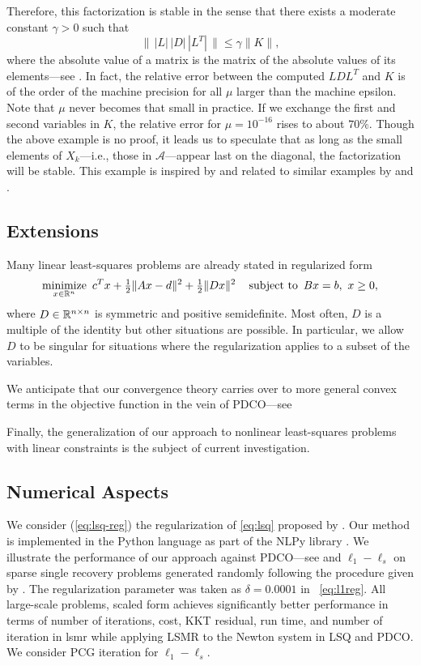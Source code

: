 \documentclass{amsart}
\begin{document}
Therefore, this factorization is stable in the sense that there exists a
moderate constant $\gamma > 0$ such that
\[
  \| \, |L| \, |D| \, |L^T| \, \| \leq \gamma \|K\|,
\]
where the absolute value of a matrix is the matrix of the absolute values of
its elements---see \cite{golub-vanloan-1996}. In fact, the relative error
between the computed $LDL^T$ and $K$ is of the order of the machine precision for
all $\mu$ larger than the machine epsilon. Note that $\mu$ never becomes that
small in practice. If we exchange the first and second variables in $K$, the
relative error for $\mu = 10^{-16}$ rises to about $70\%$. Though the above
example is no proof, it leads us to speculate that as long as the small
elements of $X_k$---i.e., those in $\mathcal{A}$---appear last on the diagonal,
the factorization will be stable. This example is inspired by and related to
similar examples by \cite{vanderbei-1995} and
\cite{gill-saunders-shinnerl-1996}.

\subsection{Extensions}

Many linear least-squares problems are already stated in regularized form
\begin{equation}
  \label{eq:reg-lsq}
  \displaystyle\mathop{\textup{minimize}}_{x \in \mathbb{R}^n} \ c^T x + \tfrac{1}{2} \|Ax - d\|^2 + \tfrac{1}{2} \|Dx\|^2 \quad
  \mathop{\textup{subject to}} \ Bx = b, \ x \geq 0,
\end{equation}
where $D \in \mathbb{R}^{n \times n}$ is symmetric and positive semidefinite. Most
often, $D$ is a multiple of the identity but other situations are possible. In
particular, we allow $D$ to be singular for situations where the regularization
applies to a subset of the variables.

We anticipate that our convergence theory carries over to more general convex
terms in the objective function in the vein  of PDCO---see

Finally, the generalization of our approach to nonlinear least-squares
problems with linear constraints is the subject of current investigation.
\subsection{Numerical Aspects}

We consider (\ref{eq:lsq-reg}) the regularization of \eqref{eq:lsq} proposed by
\cite{friedlander-orban-2012}. Our method is implemented in the Python
language as part of the \textsf{NLPy} library \citep{orban-2012}. We illustrate the performance of our approach against PDCO---see
 and $\ell_1-\ell_s$  on sparse single recovery problems generated randomly following the procedure given by \cite{kim-koh-lustig-boyd-gorinevsky-2007}. 
The regularization parameter  was taken as $\delta=0.0001$ in ~\ref{eq:l1reg}.
All large-scale  problems,  scaled form  achieves significantly better performance in terms of   number of iterations, cost, KKT residual, run time, and number of iteration in lsmr   while applying LSMR to the Newton system in LSQ and PDCO. We consider  PCG iteration for $\ell_1-\ell_s$.







\end{document}
